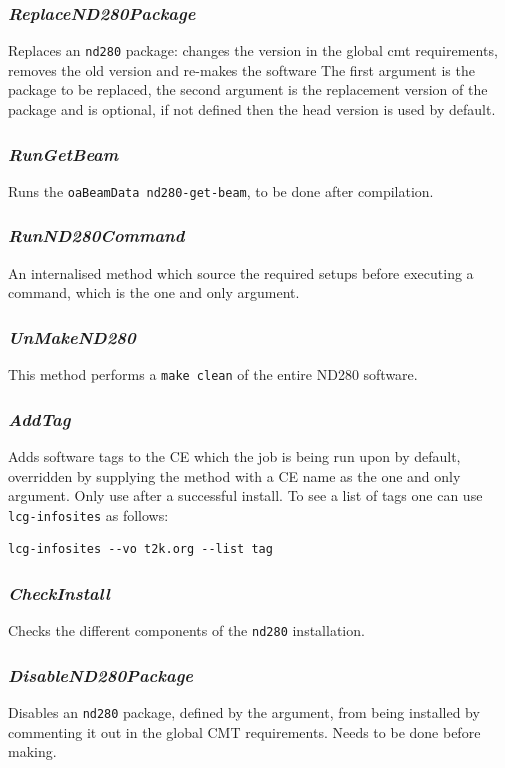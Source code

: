 \documentclass[11pt]{article}
\begin{document}
\subsubsection*{\textit{ReplaceND280Package}}
Replaces an \verb+nd280+ package: changes the version in the global cmt
requirements, removes the old version and re-makes the software The
first argument is the package to be replaced, the second argument is
the replacement version of the package and is optional, if not defined
then the head version is used by default.

\subsubsection*{\textit{RunGetBeam}}
Runs the \verb+oaBeamData nd280-get-beam+, to be done after compilation.

\subsubsection*{\textit{RunND280Command}}
An internalised method which source the required setups before
executing a command, which is the one and only argument.

\subsubsection*{\textit{UnMakeND280}}
This method performs a \verb+make clean+ of the entire ND280 software.

\subsubsection*{\textit{AddTag}}
Adds software tags to the CE which the job is being run upon by
default, overridden by supplying the method with a CE name as the one
and only argument. Only use after a successful install. To see a list of
tags one can use \verb+lcg-infosites+ as follows:
\begin{verbatim}
lcg-infosites --vo t2k.org --list tag
\end{verbatim}

\subsubsection*{\textit{CheckInstall}}
Checks the different components of the \verb+nd280+ installation.

\subsubsection*{\textit{DisableND280Package}}
Disables an \verb+nd280+ package, defined by the argument, from being
installed by commenting it out in the global CMT requirements. Needs
to be done before making.
\end{document}
